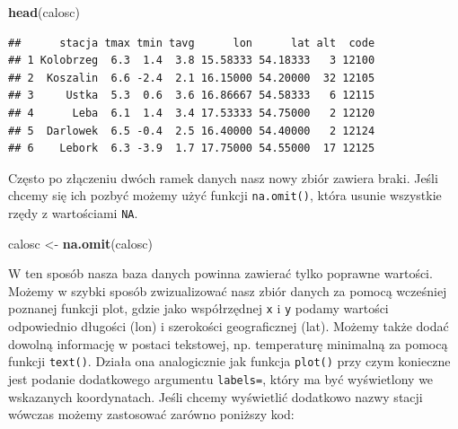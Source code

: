 \documentclass[]{book}
\newenvironment{Shaded}{\begin{snugshade}}{\end{snugshade}}
\newcommand{\KeywordTok}[1]{\textcolor[rgb]{0.13,0.29,0.53}{\textbf{#1}}}
\newcommand{\DataTypeTok}[1]{\textcolor[rgb]{0.13,0.29,0.53}{#1}}
\newcommand{\StringTok}[1]{\textcolor[rgb]{0.31,0.60,0.02}{#1}}
\newcommand{\OperatorTok}[1]{\textcolor[rgb]{0.81,0.36,0.00}{\textbf{#1}}}
\newcommand{\NormalTok}[1]{#1}
\theoremstyle{definition}
\theoremstyle{definition}
\theoremstyle{definition}
\theoremstyle{remark}
\begin{document}
\begin{Shaded}
\begin{Highlighting}[]
\KeywordTok{head}\NormalTok{(calosc)}
\end{Highlighting}
\end{Shaded}

\begin{verbatim}
##      stacja tmax tmin tavg      lon      lat alt  code
## 1 Kolobrzeg  6.3  1.4  3.8 15.58333 54.18333   3 12100
## 2  Koszalin  6.6 -2.4  2.1 16.15000 54.20000  32 12105
## 3     Ustka  5.3  0.6  3.6 16.86667 54.58333   6 12115
## 4      Leba  6.1  1.4  3.4 17.53333 54.75000   2 12120
## 5  Darlowek  6.5 -0.4  2.5 16.40000 54.40000   2 12124
## 6    Lebork  6.3 -3.9  1.7 17.75000 54.55000  17 12125
\end{verbatim}

Często po złączeniu dwóch ramek danych nasz nowy zbiór zawiera braki.
Jeśli chcemy się ich pozbyć możemy użyć funkcji \texttt{na.omit()},
która usunie wszystkie rzędy z wartościami \texttt{NA}.

\begin{Shaded}
\begin{Highlighting}[]
\NormalTok{calosc <-}\StringTok{ }\KeywordTok{na.omit}\NormalTok{(calosc)}
\end{Highlighting}
\end{Shaded}

W ten sposób nasza baza danych powinna zawierać tylko poprawne wartości.
Możemy w szybki sposób zwizualizować nasz zbiór danych za pomocą
wcześniej poznanej funkcji plot, gdzie jako współrzędnej \texttt{x} i
\texttt{y} podamy wartości odpowiednio długości (lon) i szerokości
geograficznej (lat). Możemy także dodać dowolną informację w postaci
tekstowej, np. temperaturę minimalną za pomocą funkcji \texttt{text()}.
Działa ona analogicznie jak funkcja \texttt{plot()} przy czym konieczne
jest podanie dodatkowego argumentu \texttt{labels=}, który ma być
wyświetlony we wskazanych koordynatach. Jeśli chcemy wyświetlić
dodatkowo nazwy stacji wówczas możemy zastosować zarówno poniższy kod:

\begin{Shaded}
\end{Shaded}
\end{document}
